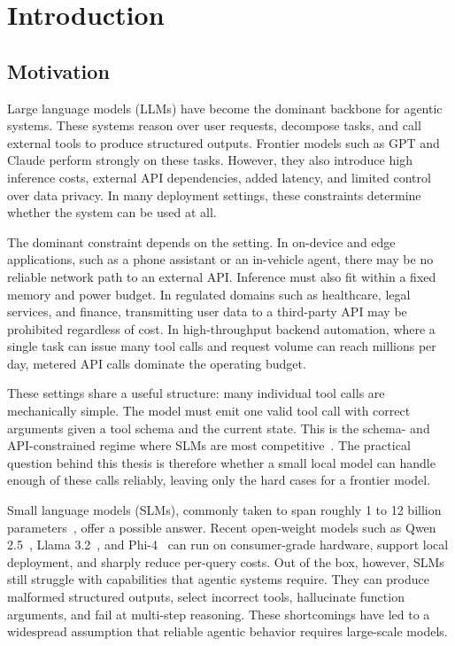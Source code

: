 \chapter{Introduction} \label{ch:introduction}

\section{Motivation}

Large language models (LLMs) have become the dominant backbone for agentic systems. These systems reason over user requests, decompose tasks, and call external tools to produce structured outputs. Frontier models such as GPT and Claude perform strongly on these tasks. However, they also introduce high inference costs, external API dependencies, added latency, and limited control over data privacy. In many deployment settings, these constraints determine whether the system can be used at all.

The dominant constraint depends on the setting. In on-device and edge applications, such as a phone assistant or an in-vehicle agent, there may be no reliable network path to an external API. Inference must also fit within a fixed memory and power budget. In regulated domains such as healthcare, legal services, and finance, transmitting user data to a third-party API may be prohibited regardless of cost. In high-throughput backend automation, where a single task can issue many tool calls and request volume can reach millions per day, metered API calls dominate the operating budget.

These settings share a useful structure: many individual tool calls are mechanically simple. The model must emit one valid tool call with correct arguments given a tool schema and the current state. This is the schema- and API-constrained regime where SLMs are most competitive~\cite{sharma2025slmagents}. The practical question behind this thesis is therefore whether a small local model can handle enough of these calls reliably, leaving only the hard cases for a frontier model.

Small language models (SLMs), commonly taken to span roughly 1 to 12 billion parameters~\cite{sharma2025slmagents}, offer a possible answer. Recent open-weight models such as Qwen 2.5~\cite{qwen2024qwen25}, Llama 3.2~\cite{metaai2024llama32}, and Phi-4~\cite{abdin2024phi} can run on consumer-grade hardware, support local deployment, and sharply reduce per-query costs. Out of the box, however, SLMs still struggle with capabilities that agentic systems require. They can produce malformed structured outputs, select incorrect tools, hallucinate function arguments, and fail at multi-step reasoning. These shortcomings have led to a widespread assumption that reliable agentic behavior requires large-scale models.

